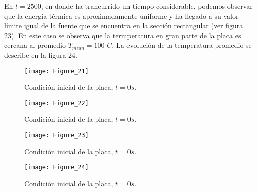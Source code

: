 \documentclass{article}
\begin{document}
\begin{itemize}
En $t = 2500$, en donde ha trancurrido un tiempo considerable, podemos observar que la energ\'ia t\'ermica es aproximadamente uniforme y ha llegado a su valor l\'imite igual de la fuente que se encuentra en la secci\'on rectangular (ver figura 23). En este caso se observa que la termperatura  en gran parte de la placa es cercana al promedio $T_{mean} = 100 ^{\circ} C$. La evoluci\'on  de la temperatura promedio se describe en la figura 24.

\begin{figure}
\begin{center}
\texttt{[image: Figure\_21]}
\end{center}
\caption{Condici\'on inicial de la placa, $t = 0 s$.}
\end{figure}

\begin{figure}
\begin{center}
\texttt{[image: Figure\_22]}
\end{center}
\caption{Condici\'on inicial de la placa, $t = 0 s$.}
\end{figure}

\begin{figure}
\begin{center}
\texttt{[image: Figure\_23]}
\end{center}
\caption{Condici\'on inicial de la placa, $t = 0 s$.}
\end{figure}

\begin{figure}
\begin{center}
\texttt{[image: Figure\_24]}
\end{center}
\caption{Condici\'on inicial de la placa, $t = 0 s$.}
\end{figure}
\end{itemize}
\end{document}
